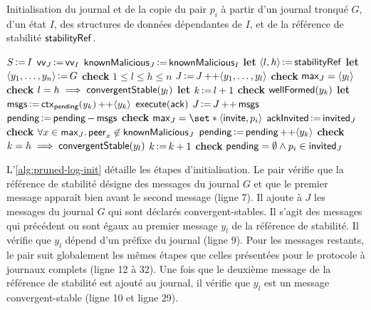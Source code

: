 \begin{algorithm}[ht]
\caption{Initialisation du journal et de la copie du pair $p_i$ à partir d'un journal tronqué $G$, d'un état $I$, des structures de données dépendantes de $I$, et de la référence de stabilité $\trm{stabilityRef}$.}\label{alg:pruned-log-init}
\begin{algorithmic}[1]
    \State $S \assign I$
    \State $\trm{vv}_J \assign \trm{vv}_I$
    \State $\trm{knownMalicious}_J \assign \trm{knownMalicious}_I$
    \State \textbf{let} $\tuple*{l,h} \assign \trm{stabilityRef}$
    \State \textbf{let} $\tuple*{y_1, \dotsc, y_n} \assign G$
    \State \textbf{check} $1 \leq l \leq h \leq n$
    \State $J \assign J \lappend \tuple*{y_1,\dotsc,y_l}$
    \State \textbf{check} $\trm{max}_J = \tuple*{y_l}$
    \State \textbf{check} $l = h \implies \trm{convergentStable}(y_l)$
    \State \textbf{let} $k \assign l + 1$
        \State \textbf{check} $\trm{wellFormed}(y_k)$
            \State \textbf{let} $\trm{msgs} \assign \trm{ctx}_{\trm{pending}}(y_k) \lappend \tuple*{y_k}$
                \State $\trm{execute}(\trm{ack})$
            \EndIf
            \State $J \assign J \lappend \trm{msgs}$
            \State $\trm{pending} \assign \trm{pending} \sminus \trm{msgs}$
                \State \textbf{check} $\trm{max}_J = \set*{\tuple*{\trm{invite}, p_i}}$
                \State $\trm{ackInvited} \assign \trm{invited}_J$
            \EndIf
            \State \textbf{check} $\forall x \in \trm{max}_J \qsep \trm{peer}_x \not\in \trm{knownMalicious}_J$
        \Else
            \State $\trm{pending} \assign \trm{pending} \lappend \tuple*{y_k}$
        \EndIf
        \State \textbf{check} $k = h \implies \trm{convergentStable}(y_l)$
        \State $k \assign k + 1$
    \EndWhile
    \State \textbf{check} $\trm{pending} = \emptyset \land p_i \in \trm{invited}_J$
\EndProcedure
\end{algorithmic}
\end{algorithm}

\clearpage

L'\autoref{alg:pruned-log-init} détaille les étapes d'initialisation.
Le pair vérifie que la référence de stabilité désigne des messages du journal $G$ et que le premier message apparaît bien avant le second message (ligne 7).
Il ajoute à $J$ les messages du journal $G$ qui sont déclarés convergent-stables.
Il s'agit des messages qui précédent ou sont égaux au premier message $y_l$ de la référence de stabilité.
Il vérifie que $y_l$ dépend d'un préfixe du journal (ligne 9).
Pour les messages restants, le pair suit globalement les mêmes étapes que celles présentées pour le protocole à journaux complets (ligne 12 à 32).
Une fois que le deuxième message de la référence de stabilité est ajouté au journal, il vérifie que $y_l$ est un message convergent-stable (ligne 10 et ligne 29).

